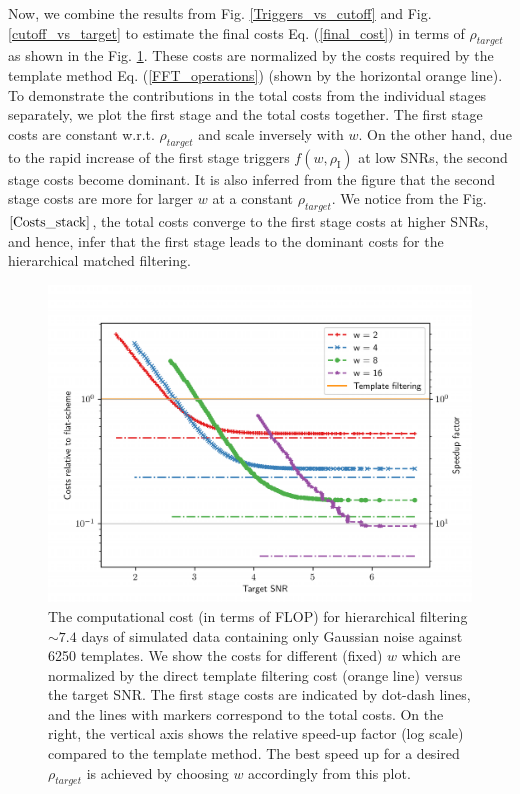 Now, we combine the results from Fig. \ref{Triggers_vs_cutoff} and Fig. \ref{cutoff_vs_target} to estimate the final costs Eq. (\ref{final_cost}) in terms of $\rho_{target}$ as shown in the Fig. \ref{Costs_stack}. These costs are normalized by the costs required by the template method Eq. (\ref{FFT_operations}) (shown by the horizontal orange line). To demonstrate the contributions in the total costs from the individual stages separately, we plot the first stage and the total costs together. The first stage costs are constant w.r.t. $\rho_{target}$ and scale inversely with $w$. On the other hand, due to the rapid increase of the first stage triggers $f(w, \rho_{\text{I}})$ at low SNRs, the second stage costs become dominant. It is also inferred from the figure that the second stage costs are more for larger $w$ at a constant $\rho_{target}$. We notice from the Fig. $\ref{Costs_stack}$, the total costs converge to the first stage costs at higher SNRs, and hence, infer that the first stage leads to the dominant costs for the hierarchical matched filtering.  

\begin{figure}
    \centering
    \includegraphics[width=\linewidth]{figures/Hierarchical_MF/Final_costs.pdf}
    \caption{The computational cost (in terms of FLOP) for hierarchical filtering $\sim 7.4$ days of simulated data containing only Gaussian noise against 6250 templates. We show the costs for different (fixed) $w$ which are normalized by the direct template filtering cost (orange line) versus the target SNR. The first stage costs are indicated by dot-dash lines, and the lines with markers correspond to the total costs. On the right, the vertical axis shows the relative speed-up factor (log scale) compared to the template method. The best speed up for a desired $\rho_{target}$ is achieved by choosing $w$ accordingly from this plot.}
    \label{Costs_stack}
\end{figure}


